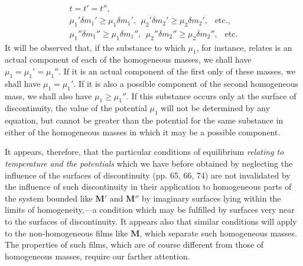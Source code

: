 \documentclass[12pt]{memoir}
\newcommand{\dd}{\delta}
\begin{document}
{\begin{gather}
t=t'=t'',  \label{482} \\
\mu_1'\dd m_1' \geq \mu_1\dd m_1', \ \ \mu_2'\dd m_2' \geq \mu_2\dd m_2', \ \ \text{ etc.},   \label{483} \\
\mu_1''\dd m_1'' \geq \mu_1\dd m_1'', \ \ \mu_2''\dd m_2'' \geq \mu_2\dd m_2'', \ \  \text{ etc.}  \label{484} \end{gather}
It will be observed that, if the substance to which $\mu_1$, for instance, relates is an actual component of each of the homogeneous masses, we shall have $\mu_1=\mu_1'=\mu_1''$. If it is an actual component of the first only of these masses, we shall have $\mu_1=\mu_1'$. If it is also a possible component of the second homogeneous mass, we shall also have $\mu_1 \geq \mu_1''$. If this substance occurs only at the surface of discontinuity, the value of the potential $\mu_1$ will not be determined by any equation, but cannot be greater than the potential for the same substance in either of the homogeneous masses in which it may be a possible component.


It appears, therefore, that the particular conditions of equilibrium \textit{relating to temperature and the potentials} which we have before obtained by neglecting the influence of the surfaces of discontinuity (pp. 65, 66, 74) are not invalidated by the influence of such discontinuity in their application to homogeneous parts of the system bounded like $\mathbf{M}'$ and $\mathbf{M}''$ by imaginary surfaces lying within the limits of homogeneity,---a condition which may be fulfilled by surfaces very near to the surfaces of discontinuity. It appears also that similar conditions will apply to the non-homogeneous films like $\mathbf{M}$, which separate such homogeneous masses. The properties of such films, which are of course different from those of homogeneous masses, require our farther attention.


}
\end{document}
